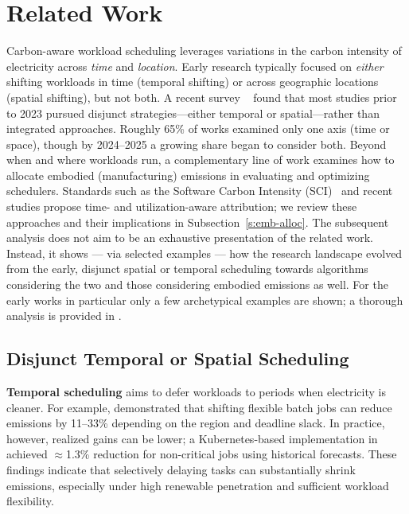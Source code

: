 \documentclass[10pt,journal,compsoc]{IEEEtran}
\begin{document}

\section{Related Work}
\label{s:rel}

Carbon-aware workload scheduling leverages variations in the carbon intensity of electricity across \textit{time} and \textit{location}. Early research typically focused on \textit{either} shifting workloads in time (temporal shifting) or across geographic locations (spatial shifting), but not both. A recent survey ~\cite{asadov2025} found that most studies prior to 2023 pursued disjunct strategies---either temporal or spatial---rather than integrated approaches. Roughly 65\% of works examined only one axis (time or space), though by 2024--2025 a growing share began to consider both. Beyond when and where workloads run, a complementary line of work examines how to allocate embodied (manufacturing) emissions in evaluating and optimizing schedulers. Standards such as the Software Carbon Intensity (SCI)~\cite{gsf2024} and recent studies propose time- and utilization-aware attribution; we review these approaches and their implications in Subsection~\ref{s:emb-alloc}. The subsequent analysis does not aim to be an exhaustive presentation of the related work. Instead, it shows — via selected examples — how the research landscape evolved from the early, disjunct spatial or temporal scheduling towards algorithms considering the two and those considering embodied emissions as well. For the early works in particular only a few archetypical examples are shown; a thorough analysis is provided in \cite{asadov2025}.

\subsection{Disjunct Temporal or Spatial Scheduling}

\textbf{Temporal scheduling} aims to defer workloads to periods when electricity is cleaner. For example, \cite{wiesner2021} demonstrated that shifting flexible batch jobs can reduce emissions by 11--33\% depending on the region and deadline slack. In practice, however, realized gains can be lower; a Kubernetes-based implementation in \cite{piontek2023} achieved $\approx$1.3\% reduction for non-critical jobs using historical forecasts. These findings indicate that selectively delaying tasks can substantially shrink emissions, especially under high renewable penetration and sufficient workload flexibility.
\end{document}

